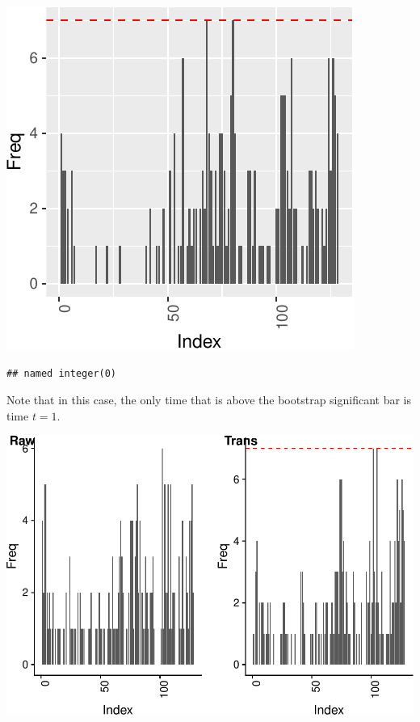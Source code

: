 \documentclass[smallextended]{svjour3}       %
\begin{document}
\begin{center}\includegraphics{springer_template_files/figure-latex/unnamed-chunk-3-1} \end{center}

\begin{verbatim}
## named integer(0)
\end{verbatim}

Note that in this case, the only time that is above the bootstrap
significant bar is time \(t = 1\).

\begin{center}\includegraphics{springer_template_files/figure-latex/unnamed-chunk-4-1} \end{center}
\end{document}
